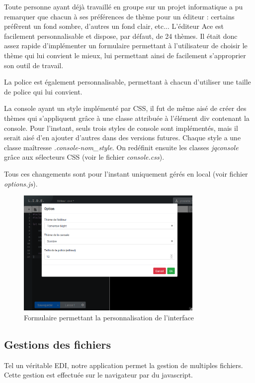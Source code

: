 Toute personne ayant déjà travaillé en groupe sur un projet informatique a pu remarquer que chacun à ses préférences de thème pour un éditeur : certains préfèrent un fond sombre, d'autres un fond clair, etc... L'éditeur Ace est facilement personnalisable et dispose, par défaut, de 24 thèmes. Il était donc assez rapide d'implémenter un formulaire permettant à l'utilisateur de choisir le thème qui lui convient le mieux, lui permettant ainsi de facilement s'approprier son outil de travail.

La police est également personnalisable, permettant à chacun d'utiliser une taille de police qui lui convient.

La console ayant un style implémenté par CSS, il fut de même aisé de créer des thèmes qui s'appliquent grâce à une classe attribuée à l'élément div contenant la console. Pour l'instant, seuls trois styles de console sont implémentés, mais il serait aisé d'en ajouter d'autres dans des versions futures. Chaque style a une classe maîtresse \emph{.console-nom\_style}. On redéfinit ensuite les classes \emph{jqconsole} grâce aux sélecteurs CSS (voir le fichier \emph{console.css}).

Tous ces changements sont pour l'instant uniquement gérés en local (voir fichier \emph{options.js}).

\begin{figure}[!h]
\centering
\includegraphics[width=0.8\textwidth]{./img/frontend/example_personnalisation.png}
\caption{Formulaire permettant la personnalisation de l'interface}
\end{figure}

\subsection{Gestions des fichiers}
Tel un véritable EDI, notre application permet la gestion de multiples fichiers. Cette gestion est effectuée sur le navigateur par du javascript.


